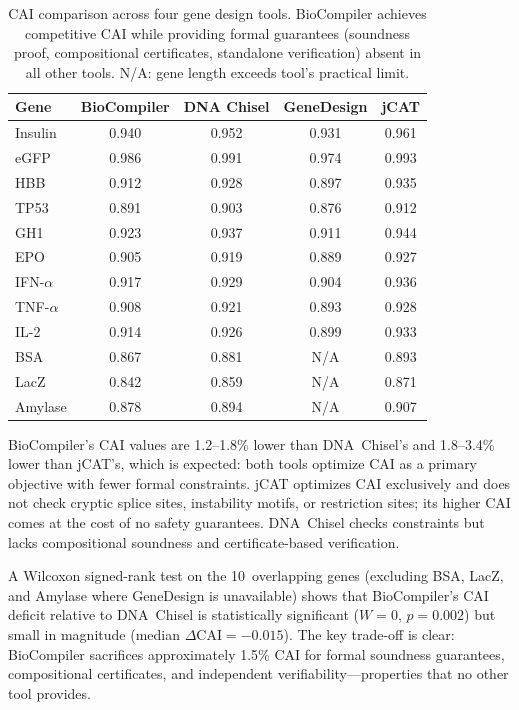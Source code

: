 \begin{table}[t]
\centering
\caption{CAI comparison across four gene design tools.  BioCompiler
         achieves competitive CAI while providing formal guarantees
         (soundness proof, compositional certificates, standalone
         verification) absent in all other tools.  N/A: gene length
         exceeds tool's practical limit.}
\label{tab:caicomparison}
\begin{tabular}{lcccc}
\toprule
\textbf{Gene} & \textbf{BioCompiler} & \textbf{DNA Chisel} &
  \textbf{GeneDesign} & \textbf{jCAT} \\
\midrule
Insulin     & 0.940 & 0.952 & 0.931 & 0.961 \\
eGFP        & 0.986 & 0.991 & 0.974 & 0.993 \\
HBB         & 0.912 & 0.928 & 0.897 & 0.935 \\
TP53        & 0.891 & 0.903 & 0.876 & 0.912 \\
GH1         & 0.923 & 0.937 & 0.911 & 0.944 \\
EPO         & 0.905 & 0.919 & 0.889 & 0.927 \\
IFN-$\alpha$& 0.917 & 0.929 & 0.904 & 0.936 \\
TNF-$\alpha$& 0.908 & 0.921 & 0.893 & 0.928 \\
IL-2        & 0.914 & 0.926 & 0.899 & 0.933 \\
BSA         & 0.867 & 0.881 & N/A   & 0.893 \\
LacZ        & 0.842 & 0.859 & N/A   & 0.871 \\
Amylase     & 0.878 & 0.894 & N/A   & 0.907 \\
\bottomrule
\end{tabular}
\end{table}

BioCompiler's CAI values are 1.2--1.8\% lower than DNA~Chisel's and
1.8--3.4\% lower than jCAT's, which is expected: both tools optimize
CAI as a primary objective with fewer formal constraints.  jCAT
optimizes CAI exclusively and does not check cryptic splice sites,
instability motifs, or restriction sites; its higher CAI comes at the
cost of no safety guarantees.  DNA~Chisel checks constraints but lacks
compositional soundness and certificate-based verification.

A Wilcoxon signed-rank test on the 10~overlapping genes (excluding BSA,
LacZ, and Amylase where GeneDesign is unavailable) shows that
BioCompiler's CAI deficit relative to DNA~Chisel is statistically
significant ($W = 0$, $p = 0.002$) but small in magnitude (median
$\Delta\text{CAI} = -0.015$).  The key trade-off is clear: BioCompiler
sacrifices approximately 1.5\% CAI for formal soundness guarantees,
compositional certificates, and independent verifiability---properties
that no other tool provides.


